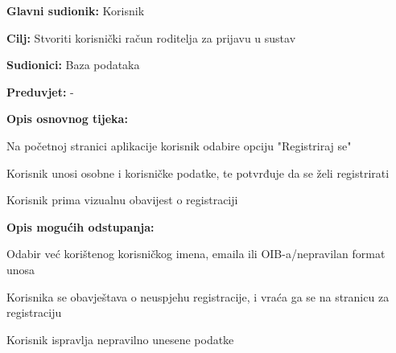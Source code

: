 					\noindent {}
					\begin{packed_item}
						
						\item \textbf{Glavni sudionik: }Korisnik
						\item  \textbf{Cilj:} Stvoriti korisnički račun roditelja za prijavu u sustav
						\item  \textbf{Sudionici:} Baza podataka
						\item  \textbf{Preduvjet:} -
						\item  \textbf{Opis osnovnog tijeka:}
						
						\item[] \begin{packed_enum}
							
							\item Na početnoj stranici aplikacije korisnik odabire opciju "Registriraj se"
							\item Korisnik unosi osobne i korisničke podatke, te potvrđuje da se želi registrirati
							\item Korisnik prima vizualnu obavijest o registraciji
						\end{packed_enum}
						
						\item  \textbf{Opis mogućih odstupanja:}
						
						\item[] \begin{packed_item}
							
							\item[2.a] Odabir već korištenog korisničkog imena, emaila ili OIB-a/nepravilan format unosa
							\item[] \begin{packed_enum}
								
								\item Korisnika se obavještava o neuspjehu registracije, i vraća ga se na stranicu za registraciju
								\item Korisnik ispravlja nepravilno unesene podatke
								
							\end{packed_enum}
						\end{packed_item}
					\end{packed_item}
					

